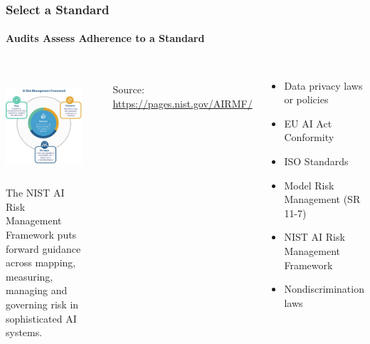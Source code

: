 \documentclass[11pt,
               aspectratio=169,
               hyperref={colorlinks}
               ]{beamer}
\begin{document}
		\begin{frame}
			
			\frametitle{Select a Standard}
			\framesubtitle{Audits Assess Adherence to a Standard}		
			
			\begin{columns}
				\centering
				\includegraphics[height=120pt]{../img/NIST_RMF_img1.png}\\
				\scriptsize{The NIST AI Risk Management Framework puts forward guidance across mapping, measuring, managing and governing risk in sophisticated AI systems.}
				
				\par\noindent\rule{100pt}{0.4pt}\\
				\vspace{5pt}
				\scriptsize{\tiny{Source: \url{https://pages.nist.gov/AIRMF/}}}
				
				\vspace{-5pt}
				\begin{itemize}
					\item Data privacy laws or policies
					\item EU AI Act Conformity
					\item ISO Standards
					\item Model Risk Management (SR 11-7)
					\item NIST AI Risk Management Framework
					\item Nondiscrimination laws
				\end{itemize}
			\end{columns}

		\end{frame}
		
\end{document}

